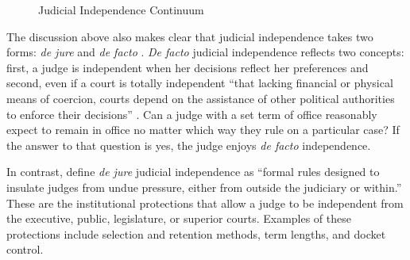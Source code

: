 \documentclass[12pt]{article}
\begin{document}
\begin{figure}[tb]\centering\caption{Judicial Independence Continuum}\label{IndCon}
\end{figure}

The discussion above also makes clear that judicial independence takes two forms: \textit{de jure} and \textit{de facto} \citep{Feld2003,Rios2014, Rosenberg1991,Voeten2008}.  \textit{De facto} judicial independence reflects two concepts: first, a judge is independent when her decisions reflect her preferences and second, even if a court is totally independent ``that lacking financial or physical means of coercion, courts depend on the assistance of other political authorities to enforce their decisions'' \citep[4]{Rios2014}. Can a judge with a set term of office reasonably expect to remain in office no matter which way they rule on a particular case? If the answer to that question is yes, the judge enjoys \textit{de facto} independence. 

In contrast, \citet[3]{Rios2014} define \textit{de jure} judicial independence as ``formal rules designed to insulate judges from undue pressure, either from outside the judiciary or within.''  These are the institutional protections that allow a judge to be independent from the executive, public, legislature, or superior courts.  Examples of these protections include selection and retention methods, term lengths, and docket control.

\end{document}
